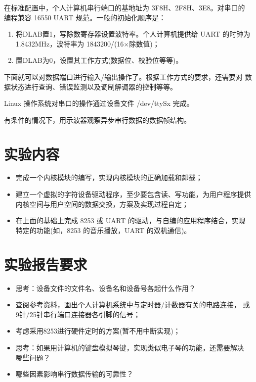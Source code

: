 	在标准配置中，个人计算机串行端口的基地址为 3F8H、2F8H、3E8。对串口的
编程兼容 16550 UART 规范。一般的初始化顺序是：
\begin{enumerate}
  \item 将DLAB置1，写除数寄存器设置波特率。个人计算机提供给 UART 的时钟为
        1.8432MHz，波特率为 1843200/(16$\times$除数值)；
  \item 置DLAB为0，设置其工作方式(数据位、校验位等等)。
\end{enumerate}

    下面就可以对数据端口进行输入/输出操作了。根据工作方式的要求，还需要对
数据状态进行查询、错误监测以及调制解调器的控制等等。

    Linux 操作系统对串口的操作通过设备文件 /dev/ttySx 完成。

    有条件的情况下，用示波器观察异步串行数据的数据帧结构。
\section{实验内容}
\begin{itemize}
  \item 完成一个内核模块的编写，实现内核模块的正确加载和卸载；
  \item 建立一个虚拟的字符设备驱动程序，至少要包含读、写功能，为用户程序提供
        内核空间与用户空间的数据交换，方案及实现过程自定；
  \item 在上面的基础上完成 8253 或 UART 的驱动，与自编的应用程序结合，实现
		特定的功能(如，8253 的音乐播放，UART 的双机通信)。
\end{itemize}

\section{实验报告要求}
\begin{itemize}
  \item 思考：设备文件的文件名、设备名和设备号各起什么作用？
  \item 查阅参考资料，画出个人计算机系统中与定时器/计数器有关的电路连接，
		或9针/25针串行端口连接器各引脚的信号；
  \item 考虑采用8253进行硬件定时的方案(暂不用中断实现)；
  \item 思考：如果用计算机的键盘模拟琴键，实现类似电子琴的功能，还需要解决
		哪些问题？
  \item 哪些因素影响串行数据传输的可靠性？
\end{itemize}
